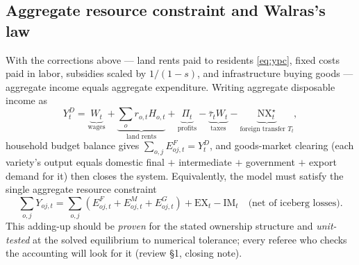 \documentclass[11pt]{article}
\begin{document}
\subsection{Aggregate resource constraint and Walras's law}
With the corrections above --- land rents paid to residents \eqref{eq:ypc}, fixed costs
paid in labor, subsidies scaled by $1/(1-s)$, and infrastructure buying goods --- aggregate
income equals aggregate expenditure. Writing aggregate disposable income as
\begin{equation}
  Y^{D}_t
  = \underbrace{W_t}_{\text{wages}}
  + \underbrace{\textstyle\sum_o r_{o,t}H_{o,t}}_{\text{land rents}}
  + \underbrace{\Pi_t}_{\text{profits}}
  - \underbrace{\bar\tau_t W_t}_{\text{taxes}}
  - \underbrace{\mathrm{NX}^{\star}_t}_{\text{foreign transfer } T_t},
\end{equation}
household budget balance gives $\sum_{o,j} E^{F}_{oj,t} = Y^{D}_t$, and goods-market
clearing (each variety's output equals domestic final $+$ intermediate $+$ government $+$
export demand for it) then closes the system. Equivalently, the model must satisfy the
single aggregate resource constraint
\begin{equation}
  \sum_{o,j} Y_{oj,t}
  = \sum_{o,j}\left( E^{F}_{oj,t} + E^{M}_{oj,t} + E^{G}_{oj,t}\right)
  + \mathrm{EX}_t - \mathrm{IM}_t
  \quad\text{(net of iceberg losses)} .
  \label{eq:walras}
\end{equation}
This adding-up should be \emph{proven} for the stated ownership structure and
\emph{unit-tested} at the solved equilibrium to numerical tolerance; every referee who
checks the accounting will look for it (review \S1, closing note).
\end{document}
